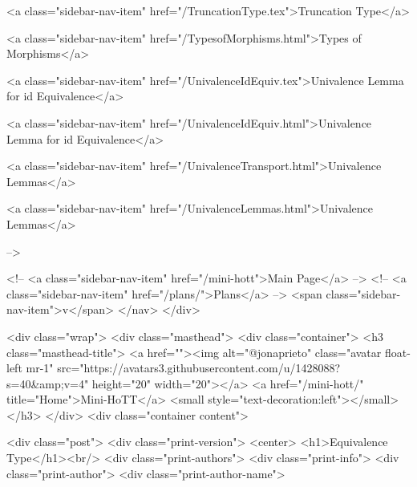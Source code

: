       
    
      
        
          <a class="sidebar-nav-item" href="/TruncationType.tex">Truncation Type</a>
        
      
    
      
        
          <a class="sidebar-nav-item" href="/TypesofMorphisms.html">Types of Morphisms</a>
        
      
    
      
        
          <a class="sidebar-nav-item" href="/UnivalenceIdEquiv.tex">Univalence Lemma for id Equivalence</a>
        
      
    
      
        
          <a class="sidebar-nav-item" href="/UnivalenceIdEquiv.html">Univalence Lemma for id Equivalence</a>
        
      
    
      
        
          <a class="sidebar-nav-item" href="/UnivalenceTransport.html">Univalence Lemmas</a>
        
      
    
      
        
          <a class="sidebar-nav-item" href="/UnivalenceLemmas.html">Univalence Lemmas</a>
        
      
     -->

    <!-- <a class="sidebar-nav-item" href="/mini-hott">Main Page</a> -->
    <!-- <a class="sidebar-nav-item" href="/plans/">Plans</a> -->
    <span class="sidebar-nav-item">v</span>
  </nav>
</div>

    <div class="wrap">
      <div class="masthead">
        <div class="container">
          <h3 class="masthead-title">
            <a href=""><img alt="@jonaprieto" class="avatar float-left mr-1" src="https://avatars3.githubusercontent.com/u/1428088?s=40&amp;v=4" height="20" width="20"></a>
            <a href="/mini-hott/" title="Home">Mini-HoTT</a>
            <small style="text-decoration:left"></small>
          </h3>
        </div>
      <div class="container content">
        







<div class="post">
  <div class="print-version">
    <center>
      <h1>Equivalence Type</h1><br/>
        <div class="print-authors">
          <div class="print-info">
            <div class="print-author">
              <div class="print-author-name">
                

